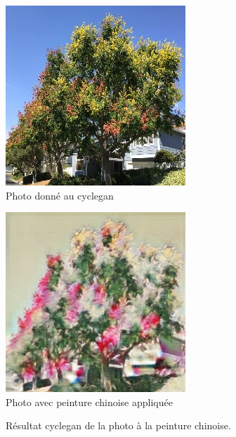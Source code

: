 \documentclass[a4paper, 12pt]{report}
\begin{document}
\begin{figure}[!h]
\centering 
\begin{minipage}{0.45\textwidth}
\centering
\includegraphics[scale=0.5]{images/cyclegan_real_A.png}
\\Photo donné au cyclegan
\\
\end{minipage}
\begin{minipage}{0.45\textwidth}
\centering
\includegraphics[scale=0.5]{images/cyclegan_fake_B.png}
\\Photo avec peinture chinoise appliquée
\end{minipage}
\caption{\centering Résultat cyclegan de la photo à la peinture chinoise.}
\label{cyclegan-result}
\end{figure}
\end{document}
